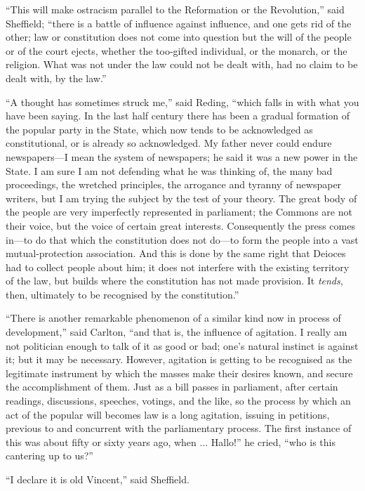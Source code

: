 ``This will make ostracism parallel to the Reformation or the
Revolution,'' said Sheffield; ``there is a battle of influence
against influence, and one gets rid of the other; law or constitution
does not come into question but the will of the people or of the court
ejects, whether the too-gifted individual, or the monarch, or the
religion. What was not under the law could not be dealt with, had no
claim to be dealt with, by the law.''

``A thought has sometimes struck me,'' said Reding,
``which falls in with what you have been saying. In the last half
century there has been a gradual formation of the popular party in the
State, which now tends to be acknowledged as constitutional, or is
already so acknowledged. My father never could endure newspapers—I
mean the system of newspapers; he said it was a new power in the
State. I am sure I am not defending what he was thinking of, the many
bad proceedings, the wretched principles, the arrogance and tyranny of
newspaper writers, but I am trying the subject by the test of your
theory. The great body of the people are very imperfectly represented
in parliament; the Commons are not their voice, but the voice of
certain great interests. Consequently the press comes in—to do that
which the constitution does not do—to form the people into a vast
mutual-protection association. And this is done by the same right that
Deioces had to collect people about him; it does not interfere with
the existing territory of the law, but builds where the constitution
has not made provision. It \emph{tends}, then, ultimately to be
recognised by the constitution.''

``There is another remarkable phenomenon of a similar kind now
in process of development,'' said Carlton, ``and that is, the
influence of agitation. I really am not politician enough to talk of
it as good or bad; one's natural instinct is against it; but it may be
necessary. However, agitation is getting to be recognised as the
legitimate instrument by which the masses make their desires known,
and secure the accomplishment of them. Just as a bill passes in
parliament, after certain readings, discussions, speeches, votings,
and the like, so the process by which an act of the popular will
becomes law is a long agitation, issuing in petitions, previous to and
concurrent with the parliamentary process. The first instance of this
was about fifty or sixty years ago, when ... Hallo!'' he cried,
``who is this cantering up to us?''

``I declare it is old Vincent,'' said Sheffield.

